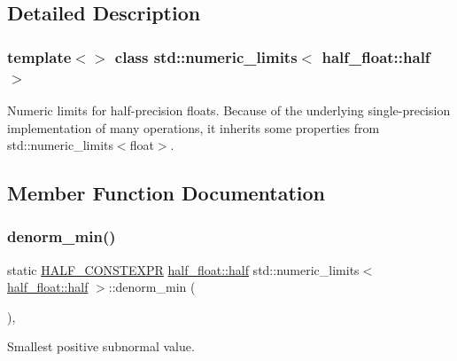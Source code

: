 \subsection{Detailed Description}
\subsubsection*{template$<$$>$\newline
class std\+::numeric\+\_\+limits$<$ half\+\_\+float\+::half $>$}

Numeric limits for half-\/precision floats. Because of the underlying single-\/precision implementation of many operations, it inherits some properties from {\ttfamily std\+::numeric\+\_\+limits$<$float$>$}. 

\subsection{Member Function Documentation}
\mbox{\label{classstd_1_1numeric__limits_3_01half__float_1_1half_01_4_ae6c0f9e198bc76d3edd0565e11c63664}} 
\subsubsection{\texorpdfstring{denorm\+\_\+min()}{denorm\_min()}}
{\footnotesize\ttfamily static \hyperlink{half_8hpp_ace3116a3e2cd66dd15780b92060987c7}{H\+A\+L\+F\+\_\+\+C\+O\+N\+S\+T\+E\+X\+PR} \hyperlink{classhalf__float_1_1half}{half\+\_\+float\+::half} std\+::numeric\+\_\+limits$<$ \hyperlink{classhalf__float_1_1half}{half\+\_\+float\+::half} $>$\+::denorm\+\_\+min (\begin{DoxyParamCaption}{ }\end{DoxyParamCaption})\hspace{0.3cm}{\ttfamily [inline]}, {\ttfamily [static]}}



Smallest positive subnormal value. 

\mbox{\label{classstd_1_1numeric__limits_3_01half__float_1_1half_01_4_ab0a429948d6c6be91abbd36f4d73eb08}} 
